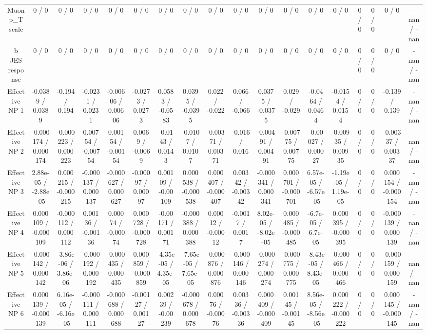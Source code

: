 \documentclass[10pt]{article}
\begin{document}
\begin{table}[htbp]
\begin{center}
\begin{tabular}{|c|c|c|c|c|c|c|c|c|c|c|c|c|c|c|c|c|c|}
  Muon p_{T} scale & 0 / 0 & 0 / 0 & 0 / 0 & 0 / 0 & 0 / 0 & 0 / 0 & 0 / 0 & 0 / 0 & 0 / 0 & 0 / 0 & 0 / 0 & 0 / 0 & 0 / 0 & 0 / 0 & 0 / 0 & 0 / 0 & -nan / -nan \\ 
  b JES response & 0 / 0 & 0 / 0 & 0 / 0 & 0 / 0 & 0 / 0 & 0 / 0 & 0 / 0 & 0 / 0 & 0 / 0 & 0 / 0 & 0 / 0 & 0 / 0 & 0 / 0 & 0 / 0 & 0 / 0 & 0 / 0 & -nan / -nan \\ 
  Effective NP 1 & -0.0389 / 0.0389 & -0.194 / 0.194 & -0.0231 / 0.0231 & -0.00606 / 0.00606 & -0.0273 / 0.0273 & 0.0583 / -0.0583 & 0.0395 / -0.0395 & 0.022 / -0.022 & 0.066 / -0.066 & 0.0375 / -0.0375 & 0.029 / -0.029 & -0.0464 / 0.0464 & -0.0154 / 0.0154 & 0 / 0 & 0 / 0 & -0.139 / 0.139 & -nan / -nan \\ 
  Effective NP 2 & -0.000174 / 0.000174 & -0.000223 / 0.000223 & 0.00754 / -0.00754 & 0.00154 / -0.00154 & 0.0069 / -0.0069 & -0.0143 / 0.0143 & -0.0107 / 0.0107 & -0.00371 / 0.00371 & -0.016 / 0.016 & -0.00491 / 0.00491 & -0.00775 / 0.00775 & -0.00027 / 0.00027 & -0.00935 / 0.00935 & 0 / 0 & 0 / 0 & -0.00337 / 0.00337 & -nan / -nan \\ 
  Effective NP 3 & 2.88e-05 / -2.88e-05 & 0.000215 / -0.000215 & -0.000137 / 0.000137 & -0.000627 / 0.000627 & -0.00097 / 0.00097 & 0.00109 / -0.00109 & 0.000538 / -0.000538 & 0.000407 / -0.000407 & 0.00342 / -0.00342 & -0.000341 / 0.000341 & 0.000701 / -0.000701 & 6.57e-05 / -6.57e-05 & -1.19e-05 / 1.19e-05 & 0 / 0 & 0 / 0 & 0.000154 / -0.000154 & -nan / -nan \\ 
  Effective NP 4 & 0.000109 / -0.000109 & -0.000112 / 0.000112 & 0.00136 / -0.00136 & 0.00074 / -0.00074 & 0.000728 / -0.000728 & -0.00171 / 0.00171 & -0.000388 / 0.000388 & 0.00012 / -0.00012 & -0.0017 / 0.0017 & 8.02e-05 / -8.02e-05 & 0.000485 / -0.000485 & -6.7e-05 / 6.7e-05 & 0.000395 / -0.000395 & 0 / 0 & 0 / 0 & -0.000139 / 0.000139 & -nan / -nan \\ 
  Effective NP 5 & -0.000142 / 0.000142 & -3.86e-06 / 3.86e-06 & -0.000192 / 0.000192 & -0.000435 / 0.000435 & 0.000859 / -0.000859 & -4.35e-05 / 4.35e-05 & -7.65e-05 / 7.65e-05 & -0.000876 / 0.000876 & -0.000146 / 0.000146 & -0.000274 / 0.000274 & -0.000775 / 0.000775 & -8.43e-05 / 8.43e-05 & -0.000466 / 0.000466 & 0 / 0 & 0 / 0 & -0.000159 / 0.000159 & -nan / -nan \\ 
  Effective NP 6 & 0.000139 / -0.000139 & 6.16e-05 / -6.16e-05 & -0.000111 / 0.000111 & -0.000688 / 0.000688 & -0.00127 / 0.00127 & 0.00239 / -0.00239 & -0.000678 / 0.000678 & 0.00076 / -0.00076 & 0.00336 / -0.00336 & 0.000409 / -0.000409 & 0.00145 / -0.00145 & 8.56e-05 / -8.56e-05 & 0.000222 / -0.000222 & 0 / 0 & 0 / 0 & 0.000145 / -0.000145 & -nan / -nan \\ 

\end{tabular}
\end{center}
\end{table}
\end{document}
